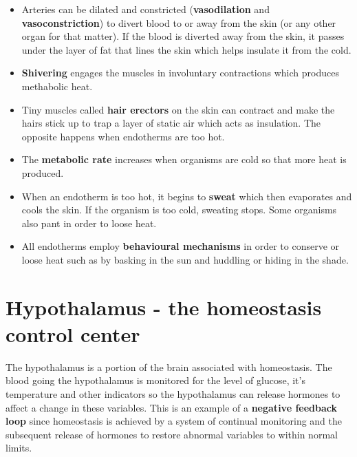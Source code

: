 \documentclass{article}
\begin{document}
\begin{itemize}

	\item Arteries can be dilated and constricted ({\bf vasodilation} and {\bf
	vasoconstriction}) to divert blood to or away from the skin (or any other
	organ for that matter). If the blood is diverted away from the skin, it
	passes under the layer of fat that lines the skin which helps insulate it
	from the cold.

	\item{\bf Shivering} engages the muscles in involuntary contractions which
	produces methabolic heat.

	\item Tiny muscles called {\bf hair erectors} on the skin can contract and
	make the hairs stick up to trap a layer of static air which acts as
	insulation. The opposite happens when endotherms are too hot.

	\item The {\bf metabolic rate} increases when organisms are cold so that
	more heat is produced.

	\item When an endotherm is too hot, it begins to {\bf sweat} which then
	evaporates and cools the skin. If the organism is too cold, sweating stops.
	Some organisms also pant in order to loose heat.

	\item All endotherms employ {\bf behavioural mechanisms} in order to
	conserve or loose heat such as by basking in the sun and huddling or hiding
	in the shade.

\end{itemize}

\section*{Hypothalamus - the homeostasis control center}

The hypothalamus is a portion of the brain associated with homeostasis. The blood going the hypothalamus is monitored for the level of glucose, it's temperature and other indicators so the hypothalamus can release hormones to affect a change in these variables. This is an example of a {\bf negative feedback loop} since homeostasis is achieved by a system of continual monitoring and the subsequent release of hormones to restore abnormal variables to within normal limits.

\end{document}
